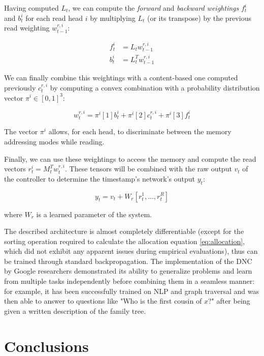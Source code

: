 \documentclass{article}
\begin{document}
\begin{enumerate}
    Having computed $L_t$, we can compute the \textit{forward} and \textit{backward weightings} $f_t^i$ and $b_t^i$ for each read head $i$ by multiplying $L_t$ (or its transpose) by the previous read weighting $w_{t-1}^{r,i}$:

    \begin{align}
        f_t^i &= L_t w_{t-1}^{r,i}\\
        b_t^i &= L_t^T w_{t-1}^{r,i}
    \end{align}

    We can finally combine this weightings with a content-based one computed previously $c_t^{r,i}$ by computing a convex combination with a probability distribution vector $\pi^i \in [0,1]^3$:

    \begin{equation}
        w_t^{r,i} = \pi^i[1]b_t^i + \pi^i[2]c_t^{r,i} + \pi^i[3]f_t^i
    \end{equation}

    The vector $\pi^i$ allows, for each head, to discriminate between the memory addressing modes while reading.
\end{enumerate}

Finally, we can use these weightings to access the memory and compute the read vectors $r_t^i = M_t^T w_t^{r,i}$. These tensors will be combined with the raw output $v_t$ of the controller to determine the timestamp's network's output $y_t$:

\begin{equation}
    y_t = v_t + W_r[r_t^1, ..., r_t^R]
\end{equation}

where $W_r$ is a learned parameter of the system.

The described architecture is almost completely differentiable (except for the sorting operation required to calculate the allocation equation \ref{eq:allocation}, which did not exhibit any apparent issues during empirical evaluations), thus can be trained through standard backpropagation. The implementation of the DNC by Google researchers demonstrated its ability to generalize problems and learn from multiple tasks independently before combining them in a seamless manner: for example, it has been successfully trained on NLP and graph traversal and was then able to answer to questions like "Who is the first cousin of $x$?" after being given a written description of the family tree.

\section{Conclusions}
\end{document}
